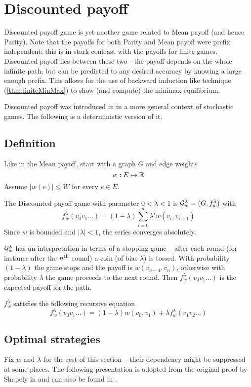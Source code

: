 \chapter{Discounted payoff}

Discounted payoff game is yet another game related to Mean payoff (and hence Parity). Note that the payoffs for both Parity and Mean payoff were prefix independent; this is in stark contrast with the payoffs for finite games. Discounted payoff lies between these two - the payoff depends on the whole infinite path, but can be predicted to any desired accuracy by knowing a large enough prefix. This allows for the use of backward induction like technique (\autoref{thm:finiteMinMax}) to show (and compute) the minimax equilibrium.

Discounted payoff was introduced in \cite{shapley_stochastic} in a more general context of stochastic games. The following is a deterministic version of it.

\section{Definition}
Like in the Mean payoff, start with a graph $G$ and edge weights
\[
    w : E \mapsto \mathbb{R}
\]
Assume $|w(e)| \leq W$ for every $e \in E$.

The Discounted payoff game with parameter $ 0 < \lambda < 1$ is $\mathcal{G}^\lambda_w=(G,f^\lambda_w)$ with
\[
    f^\lambda_w(v_0 v_1 \ldots ) =  (1-\lambda)\sum_{i=0}^\infty \lambda^i w(v_i,v_{i+1})
\]
Since $w$ is bounded and $|\lambda|<1$, the series converges absolutely.

$\mathcal{G}^\lambda_w$ has an interpretation in terms of a stopping game -- after each round (for instance after the ${n}^\text{th}$ round) a coin (of bias $\lambda$) is tossed. With probability $(1-\lambda)$ the game stops and the payoff is $w(v_{n-1},v_n)$, otherwise with probability $\lambda$ the game proceeds to the next round. Then $f^\lambda_w(v_0v_1 \ldots)$ is the expected payoff for the path.


$f^\lambda_w$ satisfies the following recursive equation
\begin{equation}
    f^\lambda_w(v_0 v_1 \ldots ) = (1-\lambda) w(v_0, v_1) + \lambda f^\lambda_w(v_1 v_2 \ldots) \label{eqn:disc-recursive}
\end{equation}
\section{Optimal strategies}
Fix $w$ and $\lambda$ for the rest of this section -- their dependency might be suppressed at some places. The following presentation is adopted from the original proof by Shapely in \cite{shapley_stochastic} and can also be found in \cite{zwick_meanpayoff}.

